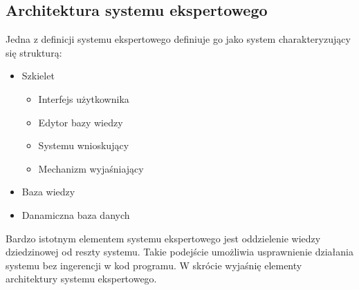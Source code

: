 \subsection{Architektura systemu ekspertowego}
\label{sec:architekturaSystemuEkspertowego}
Jedna z definicji systemu ekspertowego definiuje go jako system charakteryzujący się strukturą:
\begin{itemize}
 \item Szkielet
       \begin{itemize}
	 \item Interfejs użytkownika
	 \item Edytor bazy wiedzy
	 \item Systemu wnioskujący
	 \item Mechanizm wyjaśniający
       \end{itemize}
 \item Baza wiedzy
 \item Danamiczna baza danych
\end{itemize}

Bardzo istotnym elementem systemu ekspertowego jest oddzielenie wiedzy dziedzinowej od reszty systemu. Takie podejście umożliwia usprawnienie działania systemu bez ingerencji w kod programu. W skrócie wyjaśnię elementy architektury systemu ekspertowego.

